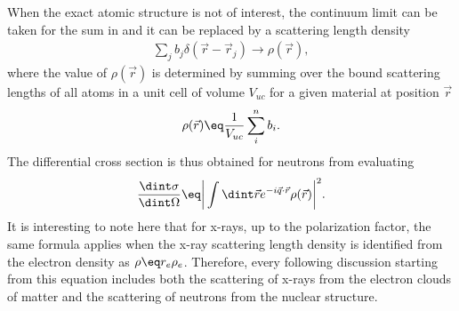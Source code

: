 \documentclass[\main/dresen_thesis.tex]{subfiles}
\begin{document}
    When the exact atomic structure is not of interest, the continuum limit can be taken for the sum in  and it can be replaced by a scattering length density
    \begin{align}
      \sum_j b_j \delta(\vec{r} - \vec{r}_j) \rightarrow \rho(\vec{r}),
    \end{align}
    where the value of $\rho(\vec{r})$ is determined by summing over the bound scattering lengths of all atoms in a unit cell of volume $V_{uc}$ for a given material at position $\vec{r}$
    \begin{align}
      \rho(\vec{r}) \eq \frac{1}{V_{uc}} \sum_i^n b_i.
    \end{align}
    The differential cross section is thus obtained for neutrons from evaluating
    \begin{align}
      \frac{\dint \sigma}{\dint \Omega} \eq \bigg| \int \dint \vec{r} e^{-i\vec{q} \cdot \vec{r}} \rho (\vec{r}) \bigg|^2.
      \label{eq:theoreticalBackground:scattering:scatteringTheory:differentialCrossSectionBornApproximation}
    \end{align}
    It is interesting to note here that for x-rays, up to the polarization factor, the same formula applies when the x-ray scattering length density is identified from the electron density as $\rho \eq r_e \rho_e$.
    Therefore, every following discussion starting from this equation includes both the scattering of x-rays from the electron clouds of matter and the scattering of neutrons from the nuclear structure.
\end{document}
